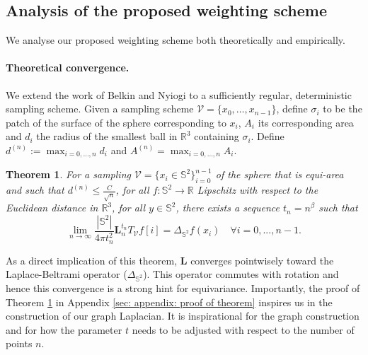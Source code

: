 \documentclass{article} %
\newtheorem{theorem}{Theorem}[section]
\renewcommand{\b}[1]{{\bm{#1}}}  %
\newcommand{\R}{\mathbb{R}}
\renewcommand{\S}{\mathbb{S}}
\newcommand{\V}{\mathcal{V}}  %
\begin{document}
\subsection{Analysis of the proposed weighting scheme}
We analyse our proposed weighting scheme both theoretically and empirically.

\paragraph{Theoretical convergence.}
We extend the work of Belkin and Nyiogi to a sufficiently regular, deterministic sampling scheme.
Given a sampling scheme $\V = \{x_0, \dots, x_{n-1}\}$, define $\sigma_i$ to be the patch of the surface of the sphere corresponding to $x_i$, $A_i$ its corresponding area and $d_i$ the radius of the smallest ball in $\R^3$ containing $\sigma_i$. Define $d^{(n)} := \max_{i=0, \dots, n}d_i$ and $A^{(n)}=\max_{i=0, \dots, n}A_i$.
\begin{theorem}
	For a sampling $\V = \{x_i\in\S^2\}_{i=0}^{n-1}$ of the sphere that is equi-area and such that $d^{(n)} \leq \frac{C}{\sqrt{n}}$, for all $f: \S^2 \rightarrow \R$ Lipschitz with respect to the Euclidean distance in $\R^3$, for all $y\in\S^2$, there exists a sequence $t_n = n^\beta$ such that 
	\begin{equation*}
	 \lim_{n\to\infty} \frac{|\mathbb{S}^2|}{4\pi t_n^2} \b{L}_n^{t_n} T_\V f [i] =  \Delta_{\mathbb{S}^2}f(x_i)\quad \forall i=0, ..., n-1.
	\end{equation*} 
	\label{theo:pointwise convergence for a regular sampling}
\end{theorem}
As a direct implication of this theorem, $\b{L}$ converges pointwisely toward the Laplace-Beltrami operator ($\Delta_{\S^2}$). This operator commutes with rotation and hence this convergence is a strong hint for equivariance.
Importantly, the proof of Theorem \ref{theo:pointwise convergence for a regular sampling} in Appendix \ref{sec: appendix: proof of theorem} inspires us in the construction of our graph Laplacian. It is inspirational for the graph construction and for how the parameter $t$ needs to be adjusted with respect to the number of points $n$.
\end{document}

